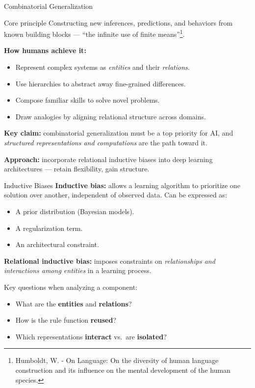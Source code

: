 \documentclass[10pt]{beamer}
\begin{document}
\begin{frame}{Combinatorial Generalization}
\begin{block}{Core principle}
Constructing new inferences, predictions, and behaviors from known building
blocks --- ``the infinite use of finite means''\footnote{
Humboldt, W. - On Language: On the diversity of human language construction and its influence on the mental development of the human species.
}.
\end{block}

\vspace{0.3cm}
\textbf{How humans achieve it:}
\begin{itemize}
    \item Represent complex systems as \emph{entities} and their \emph{relations}.
    \item Use hierarchies to abstract away fine-grained differences.
    \item Compose familiar skills to solve novel problems.
    \item Draw analogies by aligning relational structure across domains.
\end{itemize}

\vspace{0.3cm}
\textbf{Key claim:} combinatorial generalization must be a top priority for AI,
and \emph{structured representations and computations} are the path toward it.

\vspace{0.2cm}
\textbf{Approach:} incorporate relational inductive biases into deep learning
architectures --- retain flexibility, gain structure.


\end{frame}

\begin{frame}{Inductive Biases}
\textbf{Inductive bias:} allows a learning algorithm to prioritize one solution
over another, independent of observed data. Can be expressed as:
\begin{itemize}
    \item A prior distribution (Bayesian models).
    \item A regularization term.
    \item An architectural constraint.
\end{itemize}

\vspace{0.3cm}
\textbf{Relational inductive bias:} imposes constraints on \emph{relationships
and interactions among entities} in a learning process.

\vspace{0.3cm}
Key questions when analyzing a component:
\begin{itemize}
    \item What are the \textbf{entities} and \textbf{relations}?
    \item How is the rule function \textbf{reused}?
    \item Which representations \textbf{interact} vs.\ are \textbf{isolated}?
\end{itemize}
\end{frame}
\end{document}
